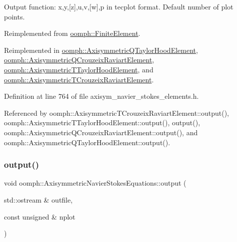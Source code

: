 Output function\+: x,y,\mbox{[}z\mbox{]},u,v,\mbox{[}w\mbox{]},p in tecplot format. Default number of plot points. 



Reimplemented from \hyperlink{classoomph_1_1FiniteElement_a2ad98a3d2ef4999f1bef62c0ff13f2a7}{oomph\+::\+Finite\+Element}.



Reimplemented in \hyperlink{classoomph_1_1AxisymmetricQTaylorHoodElement_aa092b03db26878057c3d3c92496d752d}{oomph\+::\+Axisymmetric\+Q\+Taylor\+Hood\+Element}, \hyperlink{classoomph_1_1AxisymmetricQCrouzeixRaviartElement_af7811d55e87a839fb5c01d9e306cfda8}{oomph\+::\+Axisymmetric\+Q\+Crouzeix\+Raviart\+Element}, \hyperlink{classoomph_1_1AxisymmetricTTaylorHoodElement_a538cd24096fa521e0dac0f1f78ce5446}{oomph\+::\+Axisymmetric\+T\+Taylor\+Hood\+Element}, and \hyperlink{classoomph_1_1AxisymmetricTCrouzeixRaviartElement_a25336476c872ea2e5c26698f44d7d35d}{oomph\+::\+Axisymmetric\+T\+Crouzeix\+Raviart\+Element}.



Definition at line 764 of file axisym\+\_\+navier\+\_\+stokes\+\_\+elements.\+h.



Referenced by oomph\+::\+Axisymmetric\+T\+Crouzeix\+Raviart\+Element\+::output(), oomph\+::\+Axisymmetric\+T\+Taylor\+Hood\+Element\+::output(), output(), oomph\+::\+Axisymmetric\+Q\+Crouzeix\+Raviart\+Element\+::output(), and oomph\+::\+Axisymmetric\+Q\+Taylor\+Hood\+Element\+::output().

\mbox{\label{classoomph_1_1AxisymmetricNavierStokesEquations_a94a243ca05ba3b995e366564e6cf7695}} 
\subsubsection{\texorpdfstring{output()}{output()}\hspace{0.1cm}{\footnotesize\ttfamily [2/4]}}
{\footnotesize\ttfamily void oomph\+::\+Axisymmetric\+Navier\+Stokes\+Equations\+::output (\begin{DoxyParamCaption}\item[{std\+::ostream \&}]{outfile,  }\item[{const unsigned \&}]{nplot }\end{DoxyParamCaption})\hspace{0.3cm}{\ttfamily [virtual]}}



